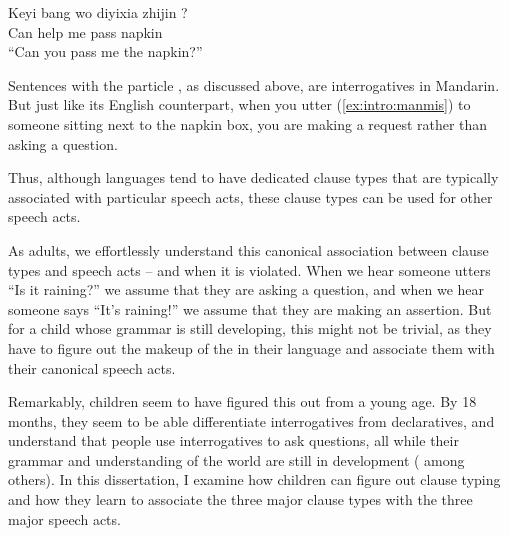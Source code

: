 \gll Keyi bang wo diyixia zhijin ?\\
Can help me pass napkin \Sfp{}\\
``Can you pass me the napkin?''
\eex

Sentences with the particle , as discussed above, are interrogatives in Mandarin. But just like its English counterpart, when you utter (\ref{ex:intro:manmis}) to someone sitting next to the napkin box, you are making a request rather than asking a question. 

Thus, although languages tend to have dedicated clause types that are typically associated with particular speech acts, these clause types can be used for other speech acts. 

As adults, we effortlessly understand this canonical association between clause types and speech acts -- and when it is violated. When we hear someone utters ``Is it raining?'' we assume that they are asking a question, and when we hear someone says ``It's raining!'' we assume that they are making an assertion.  But for a child whose grammar is still developing, this might not be trivial, as they have to figure out the makeup of the \diis{} in their language and associate them with their canonical speech acts.   %

Remarkably, children seem to have figured this out from a young age. By 18 months, they seem to be able differentiate interrogatives from declaratives, and understand that people use interrogatives to ask questions, all while their grammar and understanding of the world are still in development (\cite{geffenmintz2011,geffenmintz2015wordorder,casillas2017turn,perkins2019,marshmallowqueen} among others). In this dissertation, I examine how children can figure out clause typing and how they learn to associate the three major clause types with the three major speech acts. %

